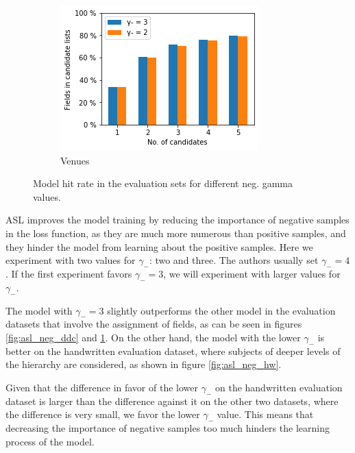 \begin{figure}
\begin{subfigure}[t]{.32\textwidth}
    \includegraphics[width=\textwidth]{figures/supervised_approach/asl_neg_venue.png}
    \caption{Venues}
    \label{fig:asl_neg_venue}
  \end{subfigure}
  \caption{Model hit rate in the evaluation sets for different neg. gamma values.}
  \label{fig:asl_neg_eval}
\end{figure}

ASL improves the model training by reducing the importance of negative samples in the loss function, as they are much more numerous than positive samples, and they hinder the model from learning about the positive samples. Here we experiment with two values for $\gamma_-$: two and three. The authors usually set $\gamma_-=4$. If the first experiment favors $\gamma_-=3$, we will experiment with larger values for $\gamma_-$.

The model with $\gamma_-=3$ slightly outperforms the other model in the evaluation datasets that involve the assignment of fields, as can be seen in figures \ref{fig:asl_neg_ddc} and \ref{fig:asl_neg_venue}. On the other hand, the model with the lower $\gamma_-$ is better on the handwritten evaluation dataset, where subjects of deeper levels of the hierarchy are considered, as shown in figure \ref{fig:asl_neg_hw}.

Given that the difference in favor of the lower $\gamma_-$ on the handwritten evaluation dataset is larger than the difference against it on the other two datasets, where the difference is very small, we favor the lower $\gamma_-$ value. This means that decreasing the importance of negative samples too much hinders the learning process of the model.


